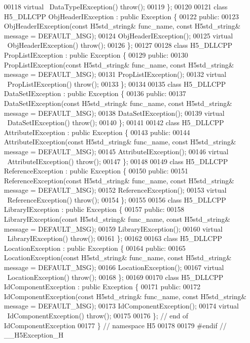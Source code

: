 \begin{DoxyCode}
00118         \textcolor{keyword}{virtual} ~DataTypeIException() throw();
00119 \};
00120 
00121 class H5\_DLLCPP ObjHeaderIException : public Exception \{
00122    \textcolor{keyword}{public}:
00123         ObjHeaderIException(\textcolor{keyword}{const} H5std\_string& func\_name, \textcolor{keyword}{const} H5std\_string& message = DEFAULT\_MSG);
00124         ObjHeaderIException();
00125         \textcolor{keyword}{virtual} ~ObjHeaderIException() throw();
00126 \};
00127 
00128 class H5\_DLLCPP PropListIException : public Exception \{
00129    \textcolor{keyword}{public}:
00130         PropListIException(\textcolor{keyword}{const} H5std\_string& func\_name, \textcolor{keyword}{const} H5std\_string& message = DEFAULT\_MSG);
00131         PropListIException();
00132         \textcolor{keyword}{virtual} ~PropListIException() throw();
00133 \};
00134 
00135 class H5\_DLLCPP DataSetIException : public Exception \{
00136    \textcolor{keyword}{public}:
00137         DataSetIException(\textcolor{keyword}{const} H5std\_string& func\_name, \textcolor{keyword}{const} H5std\_string& message = DEFAULT\_MSG);
00138         DataSetIException();
00139         \textcolor{keyword}{virtual} ~DataSetIException() throw();
00140 \};
00141 
00142 class H5\_DLLCPP AttributeIException : public Exception \{
00143    \textcolor{keyword}{public}:
00144         AttributeIException(\textcolor{keyword}{const} H5std\_string& func\_name, \textcolor{keyword}{const} H5std\_string& message = DEFAULT\_MSG);
00145         AttributeIException();
00146         \textcolor{keyword}{virtual} ~AttributeIException() throw();
00147 \};
00148 
00149 class H5\_DLLCPP ReferenceException : public Exception \{
00150    \textcolor{keyword}{public}:
00151         ReferenceException(\textcolor{keyword}{const} H5std\_string& func\_name, \textcolor{keyword}{const} H5std\_string& message = DEFAULT\_MSG);
00152         ReferenceException();
00153         \textcolor{keyword}{virtual} ~ReferenceException() throw();
00154 \};
00155 
00156 class H5\_DLLCPP LibraryIException : public Exception \{
00157    \textcolor{keyword}{public}:
00158         LibraryIException(\textcolor{keyword}{const} H5std\_string& func\_name, \textcolor{keyword}{const} H5std\_string& message = DEFAULT\_MSG);
00159         LibraryIException();
00160         \textcolor{keyword}{virtual} ~LibraryIException() throw();
00161 \};
00162 
00163 class H5\_DLLCPP LocationException : public Exception \{
00164    \textcolor{keyword}{public}:
00165         LocationException(\textcolor{keyword}{const} H5std\_string& func\_name, \textcolor{keyword}{const} H5std\_string& message = DEFAULT\_MSG);
00166         LocationException();
00167         \textcolor{keyword}{virtual} ~LocationException() throw();
00168 \};
00169 
00170 class H5\_DLLCPP IdComponentException : public Exception \{
00171    \textcolor{keyword}{public}:
00172         IdComponentException(\textcolor{keyword}{const} H5std\_string& func\_name, \textcolor{keyword}{const} H5std\_string& message = DEFAULT\_MSG);
00173         IdComponentException();
00174         \textcolor{keyword}{virtual} ~IdComponentException() throw();
00175 
00176 \}; \textcolor{comment}{// end of IdComponentException}
00177 \} \textcolor{comment}{// namespace H5}
00178 
00179 \textcolor{preprocessor}{#endif // \_\_H5Exception\_H}
\end{DoxyCode}
